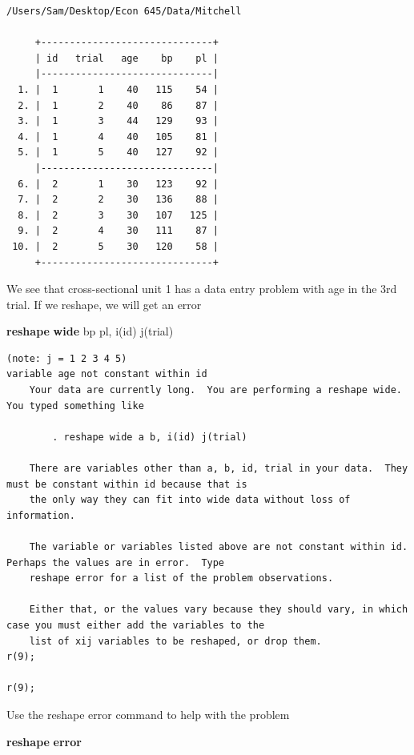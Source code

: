 \documentclass[
]{book}
\newenvironment{Shaded}{\begin{snugshade}}{\end{snugshade}}
\newcommand{\KeywordTok}[1]{\textcolor[rgb]{0.13,0.29,0.53}{\textbf{#1}}}
\newcommand{\NormalTok}[1]{#1}
\begin{document}
\begin{verbatim}
/Users/Sam/Desktop/Econ 645/Data/Mitchell

     +------------------------------+
     | id   trial   age    bp    pl |
     |------------------------------|
  1. |  1       1    40   115    54 |
  2. |  1       2    40    86    87 |
  3. |  1       3    44   129    93 |
  4. |  1       4    40   105    81 |
  5. |  1       5    40   127    92 |
     |------------------------------|
  6. |  2       1    30   123    92 |
  7. |  2       2    30   136    88 |
  8. |  2       3    30   107   125 |
  9. |  2       4    30   111    87 |
 10. |  2       5    30   120    58 |
     +------------------------------+
\end{verbatim}

We see that cross-sectional unit 1 has a data entry problem with age in the 3rd trial. If we reshape, we will get an error

\begin{Shaded}
\begin{Highlighting}[]
\KeywordTok{reshape} \KeywordTok{wide}\NormalTok{ bp pl, i(id) j(trial)}
\end{Highlighting}
\end{Shaded}

\begin{verbatim}
(note: j = 1 2 3 4 5)
variable age not constant within id
    Your data are currently long.  You are performing a reshape wide.  You typed something like

        . reshape wide a b, i(id) j(trial)

    There are variables other than a, b, id, trial in your data.  They must be constant within id because that is
    the only way they can fit into wide data without loss of information.

    The variable or variables listed above are not constant within id.  Perhaps the values are in error.  Type
    reshape error for a list of the problem observations.

    Either that, or the values vary because they should vary, in which case you must either add the variables to the
    list of xij variables to be reshaped, or drop them.
r(9);

r(9);
\end{verbatim}

Use the reshape error command to help with the problem

\begin{Shaded}
\begin{Highlighting}[]
\KeywordTok{reshape} \KeywordTok{error}
\end{Highlighting}
\end{Shaded}
\end{document}
